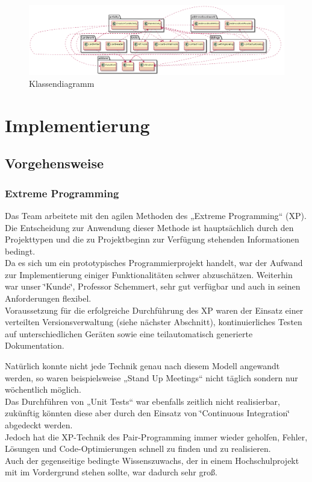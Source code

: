 \documentclass[a4paper,ngerman,12pt]{scrreprt}
\newcommand{\+}{\discretionary{\mbox{\scriptsize$\hookleftarrow$}}{}{}}
\begin{document}
 
\begin{figure}
\includegraphics[width=\textwidth]{general_class.png}
\caption{Klassendiagramm}
\end{figure}

\chapter{Implementierung}
\section{Vorgehensweise}
\subsection{Extreme Programming}

Das Team arbeitete mit den agilen Methoden des „\+Extreme Programming“ (XP). Die Entscheidung zur Anwendung dieser Methode ist hauptsächlich durch den Projekttypen und die zu Projektbeginn zur Verfügung stehenden Informationen bedingt. \\
Da es sich um ein prototypisches Programmierprojekt handelt, war der Aufwand zur Implementierung einiger Funktionalitäten schwer abzuschätzen. Weiterhin war unser \char`\"{}\+Kunde\char`\"{}, Professor Schemmert, sehr gut verfügbar und auch in seinen Anforderungen flexibel.\\ Voraussetzung für die erfolgreiche Durchführung des XP waren der Einsatz einer verteilten Versionsverwaltung (siehe nächster Abschnitt), kontinuierliches Testen auf unterschiedlichen Geräten sowie eine teilautomatisch generierte Dokumentation.

Natürlich konnte nicht jede Technik genau nach diesem Modell angewandt werden, so waren beispielsweise „\+Stand Up Meetings“ nicht täglich sondern nur wöchentlich möglich.\\ 
Das Durchführen von „\+Unit Tests“ war ebenfalls zeitlich nicht realisierbar, zukünftig könnten diese aber durch den Einsatz von \char`\"{}\+\ac{Continuous Integration}\char`\"{} abgedeckt werden. \\
Jedoch hat die X\+P-\/\+Technik des Pair-\/\+Programming immer wieder geholfen, Fehler, Lösungen und Code-\/\+Optimierungen schnell zu finden und zu realisieren. \\
Auch der gegenseitige bedingte Wissenszuwachs, der in einem Hochschulprojekt mit im Vordergrund stehen sollte, war dadurch sehr groß.
\end{document}
